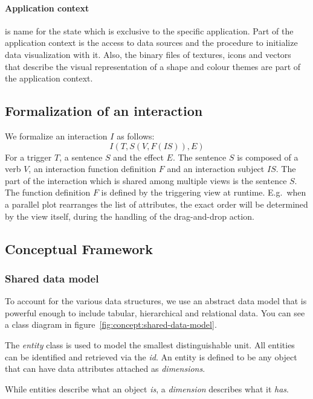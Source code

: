 \paragraph{Application context} is name for the state which is exclusive to the specific application.
Part of the application context is the access to data sources and the procedure to initialize data visualization with it.
Also, the binary files of textures, icons and vectors that describe the visual representation of a shape and colour themes are part of the application context.

\subsection{Formalization of an interaction}

We formalize an interaction $I$ as follows:
\begin{equation}
  I(T, S(V, F(IS)), E)
\end{equation}
For a trigger $T$, a sentence $S$ and the effect $E$.
The sentence $S$ is composed of a verb $V$, an interaction function definition $F$ and an interaction subject $IS$.
The part of the interaction which is shared among multiple views is the sentence $S$.
The function definition $F$ is defined by the triggering view at runtime.
E.g.\ when a parallel plot rearranges the list of attributes, the exact order will be determined by the view itself, during the handling of the drag-and-drop action.

\subsection{Conceptual Framework}

\subsubsection{Shared data model}\label{sec:concept:data-model}
To account for the various data structures, we use an abstract data model that is powerful enough to include tabular, hierarchical and relational data.
You can see a class diagram in figure~\ref{fig:concept:shared-data-model}.

The \emph{entity} class is used to model the smallest distinguishable unit.
All entities can be identified and retrieved via the \emph{id}.
An entity is defined to be any object that can have data attributes attached as \emph{dimensions}.

While entities describe what an object \emph{is}, a \emph{dimension} describes what it \emph{has}.

